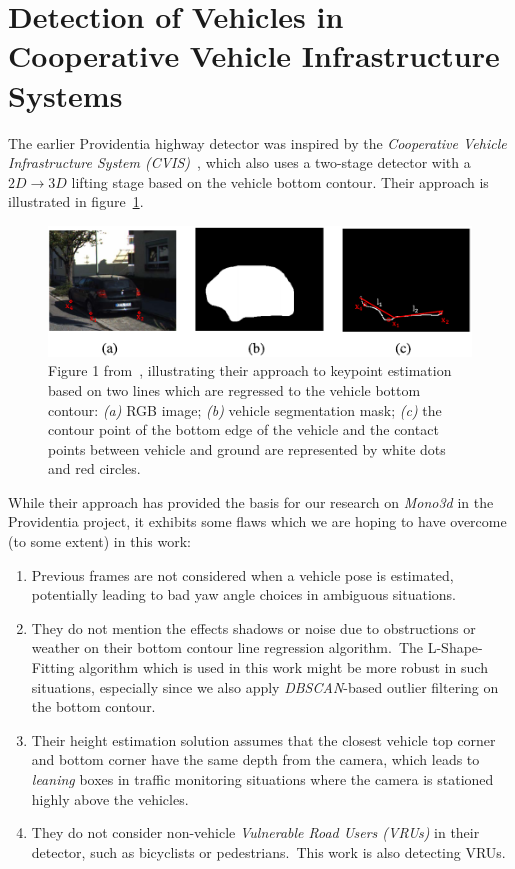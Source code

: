 \section{Detection of Vehicles in Cooperative Vehicle Infrastructure Systems}
\label{sec:related-coopvis}

The earlier Providentia highway detector was inspired by the \textit{Cooperative Vehicle Infrastructure System (CVIS)}~\cite{guo2021detection}, which also uses a two-stage detector with a $2D \rightarrow 3D$ lifting stage based on the vehicle bottom contour.
Their approach is illustrated in figure~\ref{fig:related-cvis}.

\begin{figure}[htb]
    \centering
    \includegraphics[width=1.0\linewidth]{figures/cvis_figure}
    \caption{Figure 1 from~\cite{guo2021detection}, illustrating their approach to keypoint estimation based on two lines which are regressed to the vehicle bottom contour: \textit{(a)} RGB image; \textit{(b)} vehicle segmentation mask; \textit{(c)} the contour point of the bottom edge of the vehicle and the contact points between vehicle and ground are represented by white dots and red circles.}
    \label{fig:related-cvis}
\end{figure}

While their approach has provided the basis for our research on \textit{Mono3d} in the Providentia project, it exhibits some flaws which we are hoping to have overcome (to some extent) in this work:

\begin{enumerate}
    \item Previous frames are not considered when a vehicle pose is estimated, potentially leading to bad yaw angle choices in ambiguous situations.
    \item They do not mention the effects shadows or noise due to obstructions or weather on their bottom contour line regression algorithm.\ The L-Shape-Fitting algorithm which is used in this work might be more robust in such situations, especially since we also apply \textit{DBSCAN}-based outlier filtering on the bottom contour.
    \item Their height estimation solution assumes that the closest vehicle top corner and bottom corner have the same depth from the camera, which leads to \textit{leaning} boxes in traffic monitoring situations where the camera is stationed highly above the vehicles.
    \item They do not consider non-vehicle \textit{Vulnerable Road Users (VRUs)} in their detector, such as bicyclists or pedestrians.\ This work is also detecting VRUs.
\end{enumerate}

